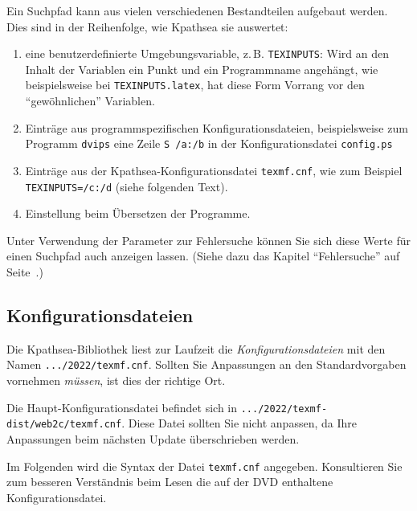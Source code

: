 \documentclass[12pt,ngerman,a4paper,fullparskip]{scrreprt}
\newcommand{\code}[1]{\texttt{#1}}
\newcommand{\file}[1]{\texttt{#1}}
\newcommand{\envname}[1]{\texttt{#1}}
\newcommand{\KPS}{Kpathsea\xspace}
\begin{document}
Ein Suchpfad kann aus vielen verschiedenen Bestandteilen aufgebaut werden.
Dies sind in der Reihenfolge, wie {\KPS} sie auswertet:

\begin{enumerate}
\item
  eine benutzerdefinierte Umgebungsvariable, z.\,B. \envname{TEXINPUTS}:
  Wird an den Inhalt der Variablen ein Punkt und ein Programmname angehängt, wie
  beispielsweise bei \envname{TEXINPUTS.latex}, hat diese Form Vorrang
  vor den \enquote{gewöhnlichen} Variablen.
\item
  Einträge aus programmspezifischen Konfigurationsdateien,
  beispielsweise zum Programm \code{dvips} eine Zeile \code{S /a:/b}
  in der Konfigurationsdatei \file{config.ps}
\item
  Einträge aus der \KPS-Konfigurationsdatei \file{texmf.cnf}, wie 
  zum Beispiel \code{TEXINPUTS=/c:/d} (siehe folgenden Text).
\item
  Einstellung beim Übersetzen der Programme.
\end{enumerate}

\noindent Unter Verwendung der Parameter zur Fehlersuche können Sie sich diese
Werte für einen Suchpfad auch anzeigen lassen. (Siehe dazu das Kapitel
\enquote{Fehlersuche} auf Seite~\pageref{sec:debugging}.)

\subsection{Konfigurationsdateien}

Die \KPS-Bibliothek liest zur Laufzeit die \emph{Konfigurationsdateien} mit den Namen \file{.../2022/texmf.cnf}. Sollten Sie Anpassungen an den Standardvorgaben vornehmen \textit{müssen}, ist dies der richtige Ort. 

Die Haupt-Konfigurationsdatei befindet sich in \file{.../2022/texmf-dist/web2c/texmf.cnf}. Diese Datei sollten Sie nicht anpassen, da Ihre Anpassungen beim nächsten Update überschrieben werden.

Im Folgenden wird die Syntax der Datei \file{texmf.cnf} angegeben. Konsultieren Sie zum besseren Verständnis beim Lesen die auf der DVD enthaltene Konfigurationsdatei.
\end{document}
